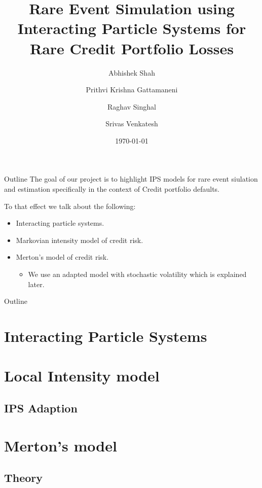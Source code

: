\documentclass{beamer}
\title{Rare Event Simulation using Interacting Particle Systems for Rare Credit Portfolio Losses}
\author{
  Abhishek Shah \\
  \and
  Prithvi Krishna Gattamaneni\\
  \and
  Raghav Singhal\\
  \and
  Srivas Venkatesh \\
}
\institute[New York University] %
{
  Courant Institute of Mathematical Sciences\\
  New York University\\
}
\date{\today}
\begin{document}
\begin{frame}
	\titlepage
\end{frame}


\begin{frame}{Outline}
	The goal of our project is to highlight IPS models for rare event siulation
	and estimation specifically in the context of Credit portfolio defaults.
																
	To that effect we talk about the following:
	\begin{itemize}
		\item Interacting particle systems.
		\item Markovian intensity model of credit risk.
		\item Merton's model of credit risk.
		      \begin{itemize}
		      	\item We use an adapted model with stochastic volatility which
		      	      is explained later.
		      \end{itemize}
	\end{itemize}
\end{frame}

\begin{frame}{Outline}
	\tableofcontents
\end{frame}

\section{Interacting Particle Systems}
\section{Local Intensity model}
\subsection{IPS Adaption}

%
\section{Merton's model}
\subsection{Theory}

\end{document}
